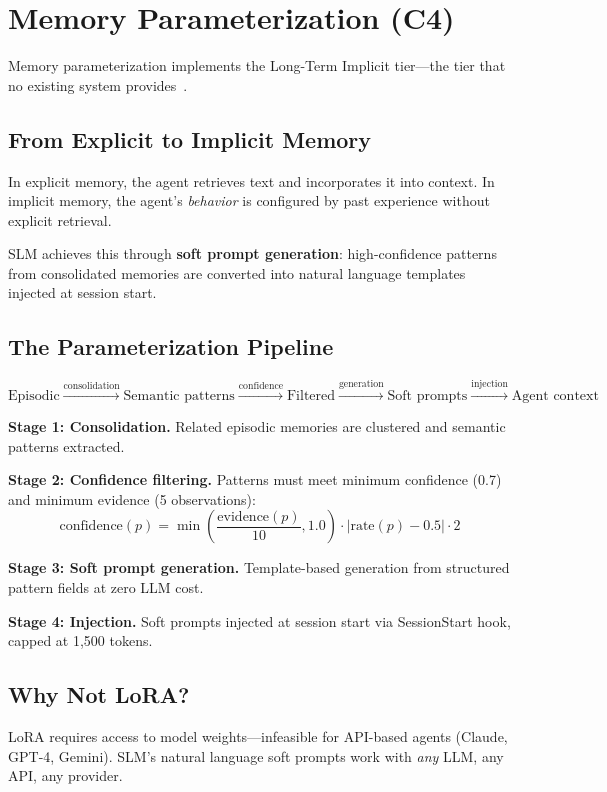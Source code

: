 \section{Memory Parameterization (C4)}
\label{sec:parameterization}

Memory parameterization implements the Long-Term Implicit tier---the tier that no existing system provides~\cite{cognitive-memory-survey}.

\subsection{From Explicit to Implicit Memory}

In explicit memory, the agent retrieves text and incorporates it into context. In implicit memory, the agent's \emph{behavior} is configured by past experience without explicit retrieval.

SLM achieves this through \textbf{soft prompt generation}: high-confidence patterns from consolidated memories are converted into natural language templates injected at session start.

\subsection{The Parameterization Pipeline}

\begin{equation*}
\text{Episodic} \xrightarrow{\text{consolidation}} \text{Semantic patterns} \xrightarrow{\text{confidence}} \text{Filtered} \xrightarrow{\text{generation}} \text{Soft prompts} \xrightarrow{\text{injection}} \text{Agent context}
\end{equation*}

\textbf{Stage 1: Consolidation.} Related episodic memories are clustered and semantic patterns extracted.

\textbf{Stage 2: Confidence filtering.} Patterns must meet minimum confidence (0.7) and minimum evidence (5 observations):
\begin{equation}
\text{confidence}(p) = \min\left(\frac{\text{evidence}(p)}{10}, 1.0\right) \cdot \left|\text{rate}(p) - 0.5\right| \cdot 2
\end{equation}

\textbf{Stage 3: Soft prompt generation.} Template-based generation from structured pattern fields at zero LLM cost.

\textbf{Stage 4: Injection.} Soft prompts injected at session start via SessionStart hook, capped at 1,500 tokens.

\subsection{Why Not LoRA?}

LoRA requires access to model weights---infeasible for API-based agents (Claude, GPT-4, Gemini). SLM's natural language soft prompts work with \emph{any} LLM, any API, any provider.

